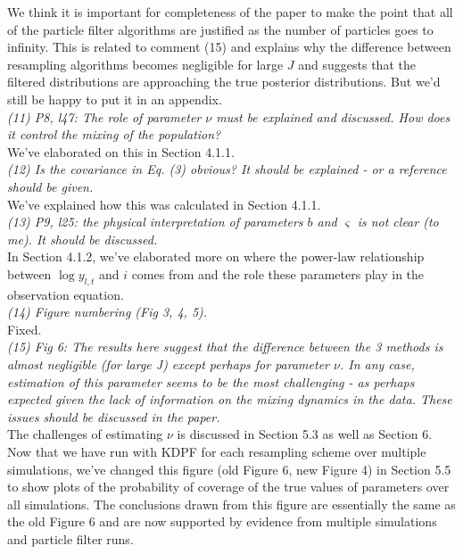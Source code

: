 \documentclass{article}
\begin{document}
We think it is important for completeness of the paper to make the point that all of the particle filter algorithms are justified as the number of particles goes to infinity. This is related to comment (15) and explains why the difference between resampling algorithms becomes negligible for large $J$ and suggests that the filtered distributions are approaching the true posterior distributions. But we'd still be happy to put it in an appendix. \\

\noindent \emph{(11) P8, l47: The role of parameter $\nu$ must be explained and discussed. How does it control the mixing of the population?} \\

We've elaborated on this in Section 4.1.1. \\

\noindent \emph{(12) Is the covariance in Eq. (3) obvious? It should be explained - or a reference should be given.} \\

We've explained how this was calculated in Section 4.1.1. \\

\noindent \emph{(13) P9, l25: the physical interpretation of parameters $b$ and $\varsigma$ is not clear (to me). It should be discussed.} \\

In Section 4.1.2, we've elaborated more on where the power-law relationship between $\log y_{l,t}$ and $i$ comes from and the role these parameters play in the observation equation. \\

\noindent \emph{(14) Figure numbering (Fig 3, 4, 5).} \\

Fixed. \\

\noindent \emph{(15) Fig 6: The results here suggest that the difference between the 3 methods is almost negligible (for large J) except perhaps for parameter $\nu$. In any case, estimation of this parameter seems to be the most challenging - as perhaps expected given the lack of information on the mixing dynamics in the data. These issues should be discussed in the paper.} \\

The challenges of estimating $\nu$ is discussed in Section 5.3 as well as Section 6. Now that we have run with KDPF for each resampling scheme over multiple simulations, we've changed this figure (old Figure 6, new Figure 4) in Section 5.5 to show plots of the probability of coverage of the true values of parameters over all simulations. The conclusions drawn from this figure are essentially the same as the old Figure 6 and are now supported by evidence from multiple simulations and particle filter runs. \\
\end{document}
